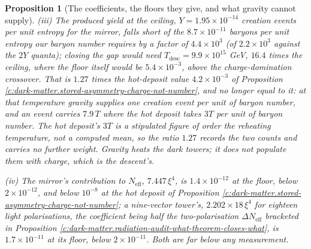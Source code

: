 \documentclass[11pt]{article}
\newtheorem{proposition}[theorem]{Proposition}
\theoremstyle{definition}
\theoremstyle{plain}
\providecommand{\Neff}{}\renewcommand{\Neff}{N_{\mathrm{eff}}}
\begin{document}
\begin{proposition}[The coefficients, the floors they give, and what gravity cannot supply]
(iii) The produced yield at the ceiling, $Y = 1.95 \times 10^{-14}$ creation events per unit entropy for the mirror, falls short of the $8.7 \times 10^{-11}$ baryons per unit entropy our baryon number requires by a factor of $4.4 \times 10^{3}$ (of $2.2 \times 10^{3}$ against the $2Y$ quanta); closing the gap would need $T_{\mathrm{desc}} = 9.9 \times 10^{15}$ GeV, $16.4$ times the ceiling, where the floor itself would be $5.4 \times 10^{-3}$, above the charge-domination crossover. That is $1.27$ times the hot-deposit value $4.2 \times 10^{-3}$ of Proposition \ref{c:dark-matter.stored-asymmetry-charge-not-number}, and no longer equal to it: at that temperature gravity supplies one creation event per unit of baryon number, and an event carries $7.9\,T$ where the hot deposit takes $3T$ per unit of baryon number. The hot deposit's $3T$ is a stipulated figure of order the reheating temperature, not a computed mean, so the ratio $1.27$ records the two counts and carries no further weight. Gravity heats the dark towers; it does not populate them with charge, which is the descent's.

(iv) The mirror's contribution to $\Neff$, $7.447\,\xi^{4}$, is $1.4 \times 10^{-12}$ at the floor, below $2 \times 10^{-12}$, and below $10^{-8}$ at the hot deposit of Proposition \ref{c:dark-matter.stored-asymmetry-charge-not-number}; a nine-vector tower's, $2.202 \times 18\,\xi^{4}$ for eighteen light polarisations, the coefficient being half the two-polarisation $\Delta\Neff$ bracketed in Proposition \ref{c:dark-matter.radiation-audit-what-theorem-closes-what}, is $1.7 \times 10^{-11}$ at its floor, below $2 \times 10^{-11}$. Both are far below any measurement.
\end{proposition}
\end{document}
